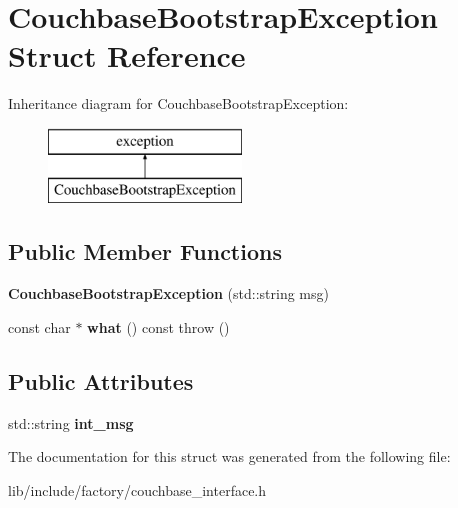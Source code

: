 \hypertarget{structCouchbaseBootstrapException}{\section{Couchbase\-Bootstrap\-Exception Struct Reference}
\label{structCouchbaseBootstrapException}
}
Inheritance diagram for Couchbase\-Bootstrap\-Exception\-:\begin{figure}[H]
\begin{center}
\leavevmode
\includegraphics[height=2.000000cm]{structCouchbaseBootstrapException}
\end{center}
\end{figure}
\subsection*{Public Member Functions}
\begin{DoxyCompactItemize}
\item 
\hypertarget{structCouchbaseBootstrapException_a6e08bb0106a77ecb072794b243e52f17}{{\bfseries Couchbase\-Bootstrap\-Exception} (std\-::string msg)}\label{structCouchbaseBootstrapException_a6e08bb0106a77ecb072794b243e52f17}

\item 
\hypertarget{structCouchbaseBootstrapException_a44f1e8eb8cff88cddc27068175db958e}{const char $\ast$ {\bfseries what} () const   throw ()}\label{structCouchbaseBootstrapException_a44f1e8eb8cff88cddc27068175db958e}

\end{DoxyCompactItemize}
\subsection*{Public Attributes}
\begin{DoxyCompactItemize}
\item 
\hypertarget{structCouchbaseBootstrapException_a95a224b94ed150bfd5b3015c84bbd56c}{std\-::string {\bfseries int\-\_\-msg}}\label{structCouchbaseBootstrapException_a95a224b94ed150bfd5b3015c84bbd56c}

\end{DoxyCompactItemize}


The documentation for this struct was generated from the following file\-:\begin{DoxyCompactItemize}
\item 
lib/include/factory/couchbase\-\_\-interface.\-h\end{DoxyCompactItemize}
